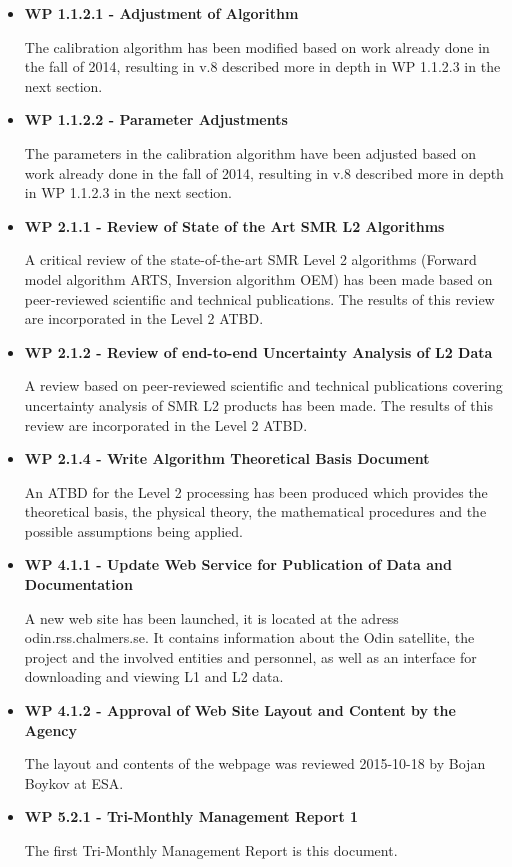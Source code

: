 \begin{itemize}
\item{\bf WP 1.1.2.1 - Adjustment of Algorithm}

The calibration algorithm has been modified based on work already done in the fall of 2014, resulting in v.8 described more in depth in WP 1.1.2.3 in the next section.

\item{\bf WP 1.1.2.2 - Parameter Adjustments}

The parameters in the calibration algorithm have been adjusted based on work already done in the fall of 2014, resulting in v.8 described more in depth in WP 1.1.2.3 in the next section.

\item{\bf WP 2.1.1 - Review of State of the Art SMR L2 Algorithms}

A critical review of the state-of-the-art SMR Level 2 algorithms
(Forward model algorithm ARTS, Inversion algorithm OEM) has been made based on peer-reviewed scientific and technical publications. The results of this review are incorporated in the Level 2 ATBD.

\item{\bf WP 2.1.2 - Review of end-to-end Uncertainty Analysis of L2 Data}

 A review based on peer-reviewed scientific and technical publications covering uncertainty analysis of SMR L2 products has been made. The results of this review are incorporated in the Level 2 ATBD.

\item{\bf WP 2.1.4 - Write Algorithm Theoretical Basis Document}

An ATBD for the Level 2 processing has been produced which provides the theoretical basis, the physical theory, the mathematical procedures and the possible assumptions being applied.

\item {\bf WP 4.1.1 - Update Web Service for Publication of Data and Documentation}

A new web site has been launched, it is located at the adress odin.rss.chalmers.se. It contains information about the Odin satellite, the project and the involved entities and personnel, as well as an interface for downloading and viewing L1 and L2 data.   

\item {\bf WP 4.1.2 - Approval of Web Site Layout and Content by the Agency}

The layout and contents of the webpage was reviewed 2015-10-18 by Bojan Boykov at ESA. 

\item {\bf WP 5.2.1 - Tri-Monthly Management Report 1}

The first Tri-Monthly Management Report is this document. 



\end{itemize}



